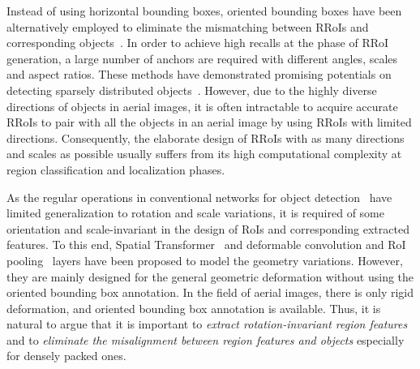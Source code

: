 \documentclass[11pt,onecolumn]{article}         \usepackage[top=3.6cm, bottom=3.2cm, left=2.3cm, right=2.3cm]{geometry}
\begin{document}
Instead of using horizontal bounding boxes, oriented bounding boxes have been alternatively employed to eliminate the mismatching between RRoIs and corresponding objects~\cite{DOTA,DLR3KMunichVehicle,HRSC2016}. 
In order to achieve high recalls at the phase of RRoI generation, a large number of anchors are required with different angles, scales and aspect ratios.
These methods have demonstrated promising potentials on detecting sparsely distributed objects~\cite{RRCNN, RSD, SRBBS, RRPN}. 
However, due to the highly diverse directions of objects in aerial images, it is often intractable to acquire accurate RRoIs to pair with all the objects in an aerial image by using RRoIs with limited directions.
Consequently, the elaborate design of RRoIs with as many directions and scales as possible usually suffers from its high computational complexity at region classification and localization phases. 


As the regular operations in conventional networks for object detection~\cite{Fast_RCNN} have limited generalization to rotation and scale variations, it is required of some orientation and scale-invariant in the design of RoIs and corresponding extracted features. To this end, Spatial Transformer~\cite{stn} and deformable convolution and RoI pooling~\cite{Deformable}  layers have been proposed to model the geometry variations. 
However, they are mainly designed for the general geometric deformation without using the oriented bounding box annotation. In the field of aerial images, there is only rigid deformation, and oriented bounding box annotation is available.
Thus, it is natural to argue that it is important to {\em extract rotation-invariant region features} and to {\em eliminate the misalignment between region features and objects} especially for densely packed ones. 
\end{document}
